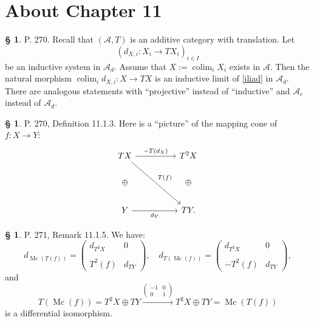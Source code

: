 \documentclass[12pt]{article}%
\theoremstyle{remark}
\theoremstyle{definition}
\newtheorem{s}[thm]{\S}%
\newcommand{\A}{\mathcal A}
\newcommand{\xr}{\xrightarrow}
\DeclareMathOperator*{\colim}{colim}
\DeclareMathOperator{\Mc}{Mc}
\begin{document}

\section{About Chapter 11}

\begin{s}
P. 270. Recall that $(\A,T)$ is an additive category with translation. Let 
\begin{equation}\label{iliad}
(d_{X,i}:X_i\to TX_i)_{i\in I}
\end{equation} 
be an inductive system in $\A_d$. Assume that $X:=\colim_iX_i$ exists in $\A$. Then the natural morphism $\colim_id_{X,i}:X\to TX$ is an inductive limit of \eqref{iliad} in $\A_d$. There are analogous statements with ``projective'' instead of ``inductive'' and $\A_c$ instead of $\A_d$.
\end{s}

%

\begin{s}
P. 270, Definition 11.1.3. Here is a ``picture'' of the mapping cone of $f:X\to Y$:
$$
\begin{tikzcd}
TX\ar{rr}{-T(d_X)}\ar{rrdd}{T(f)}&&T^2X\\ 
\oplus&&\oplus\\ 
Y\ar{rr}[swap]{d_Y}&&TY.
\end{tikzcd}
$$
\end{s}

%

\begin{s}
P. 271, Remark 11.1.5. We have:
$$
d_{\Mc(T(f))}=
\begin{pmatrix}
d_{T^2X}&0\\ \\ 
T^2(f)&d_{TY}
\end{pmatrix},\quad 
d_{T(\Mc(f))}=
\begin{pmatrix}
d_{T^2X}&0\\ \\ 
-T^2(f)&d_{TY}
\end{pmatrix},
$$ 
and 
$$
T(\Mc(f))=T^2X\oplus TY\xr{\begin{pmatrix}-1&0\\ 0&1\end{pmatrix}}T^2X\oplus TY=\Mc(T(f))
$$ 
is a differential isomorphism.
\end{s}

%
\end{document}
